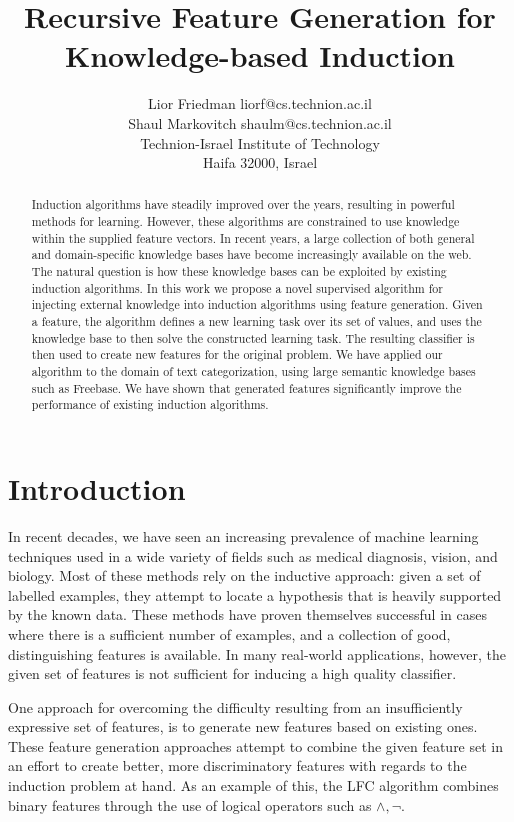 \documentclass[twoside,11pt]{article}
\title{Recursive Feature Generation for Knowledge-based Induction}
\author{\name Lior Friedman \email liorf@cs.technion.ac.il \\
	\name Shaul Markovitch \email shaulm@cs.technion.ac.il \\
	\addr Technion-Israel Institute of Technology\\
	Haifa 32000, Israel
	}
\theoremstyle{definition}
\begin{document}
\maketitle

\begin{abstract}
  Induction algorithms have steadily improved over the years, resulting in powerful methods for learning. However, these algorithms are constrained to use knowledge within the supplied feature vectors. In recent years, a large collection of both general and domain-specific knowledge bases have become increasingly available on the web. The natural question is how these knowledge bases can be exploited by existing induction algorithms.
  In this work we propose a novel supervised algorithm for injecting external knowledge into induction algorithms using feature generation. Given a feature, the algorithm defines a new learning task over its set of values, and uses the knowledge base to then solve the constructed learning task. The resulting classifier is then used to create new features for the original problem.
  We have applied our algorithm to the domain of text categorization, using large semantic knowledge bases such as Freebase. We have shown that generated features significantly improve the performance of existing induction algorithms.
\end{abstract}

\section{Introduction}
\label{sec:Intro}
In recent decades, we have seen an increasing prevalence of machine learning techniques used in a wide variety of fields such as medical diagnosis, vision, and biology.
Most of these methods rely on the inductive approach: given a set of labelled examples, they attempt to locate a hypothesis that is heavily supported by the known data. These methods have proven themselves successful in cases where there is a sufficient number of examples, and a collection of good,
distinguishing features is available.
In many real-world applications, however, the given set of features is not sufficient for inducing a high quality classifier.

One approach for overcoming the difficulty resulting from an insufficiently expressive set of features, is to generate new features based on existing ones. 
These feature generation approaches attempt to combine the given feature set in an effort to create better, more discriminatory features with regards to the induction problem at hand. As an example of this, the LFC algorithm \cite{ragavan1993complex} combines binary features through the use of logical operators such as $\land ,\lnot$.
\end{document}
